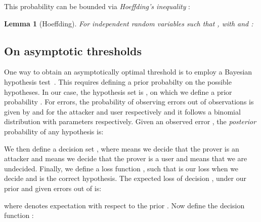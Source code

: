\documentclass[a4paper]{article}
\theoremstyle{plain} \newtheorem{remark}{Remark}
\theoremstyle{plain} \newtheorem{definition}{Definition}
\theoremstyle{plain} \newtheorem{example}{Example}
\theoremstyle{plain} \newtheorem{assumption}{Assumption}
\theoremstyle{plain} \newtheorem{conjecture}{Conjecture}
\theoremstyle{plain} \newtheorem{theorem}{Theorem}
\theoremstyle{plain} \newtheorem{proposition}{Proposition}
\theoremstyle{plain} \newtheorem{lemma}{Lemma}
\theoremstyle{plain} \newtheorem{corollary}{Corollary}
\begin{document}
This probability can be bounded via \textit{Hoeffding's inequality} \cite{Hoeffding}:
\label{sec:Hoeffding}
\begin{lemma}[Hoeffding]
  For independent random variables  such that
  , with   and :
  
  \label{lem:hoeffding}
\end{lemma}
\iffalse
Specifically for Bernoulli trials, we can use the Chernoff-Hoeffding
bound~\cite{Hoeffding}:
\begin{lemma}[Chernoff-Hoeffding]
  For independent random variables  such that , with  and :
  
  \label{lem:chernoff-hoeffding}
\end{lemma}
\fi
\subsection{On asymptotic thresholds}
\label{app:asymptotics}
One way to obtain an asymptotically optimal threshold is to employ a
Bayesian hypothesis test~\cite{Degroot:OptimalStatisticalDecisions}.
This requires defining a prior probabilty on the possible
hypotheses. In our case, the hypothesis set is , on
which we define a prior probability . For  errors, the
probability of observing  errors out of  observations is
given by  and  for the attacker
and user respectively and it follows a binomial distribution with
parameters  respectively. Given an observed error , the
{\em posterior} probability of any hypothesis  is:

We then define a decision set , where  means we decide that the prover is
an attacker and  means we decide that the prover is a user
and  means that we are undecided.  Finally, we define
a loss function , such that  is our loss when we decide  and  is the correct
hypothesis.  The expected loss of decision , under
our prior and given  errors out of  is:

where  denotes expectation with respect to the prior .
Now define the decision function :
\end{document}
